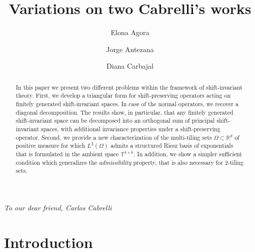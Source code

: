 \documentclass[a4paper,11pt]{amsart}
\theoremstyle{definition}
\theoremstyle{definition}
\def\R{\mathbb{R}}
\def\T{\mathbb{T}}
\begin{document}
	
	\title{Variations on two Cabrelli's works}
	
	\author{Elona Agora}
	\address{ CUNEF Universidad, Madrid, Spain}
	
	\author{Jorge Antezana}
	\address{ Barcelona University, Barcelona, Spain}
	
	\author{Diana Carbajal}
	\address{ University of Vienna, Vienna, Austria }
	
	
	
	\date{}
	
	
	\maketitle
	
	\begin{center}
		\textit{To our dear friend, Carlos Cabrelli}
	\end{center}
	
	\medskip
	
	\begin{abstract}
		In this paper we present two different problems within the framework of shift-invariant theory. First, we develop a triangular form for shift-preserving operators acting on finitely generated shift-invariant spaces. In case of the normal operators, we recover a diagonal decomposition. The results show, in particular, that any finitely generated shift-invariant space can be decomposed into an orthogonal sum of principal shift-invariant spaces, with additional invariance properties under a shift-preserving operator.
		Second, we provide a new characterization of the multi-tiling sets $\Omega\subset\R^d$ of positive measure for which $L^2(\Omega)$ admits a structured Riesz basis of exponentials that is formulated in the ambient space $\T^{k\times k}$. In addition, we show a simpler sufficient condition which generalizes the \textit{admissibility} property, that is also necessary for 2-tiling sets.
	\end{abstract}
	
	
	\section{Introduction}
	
\end{document}
